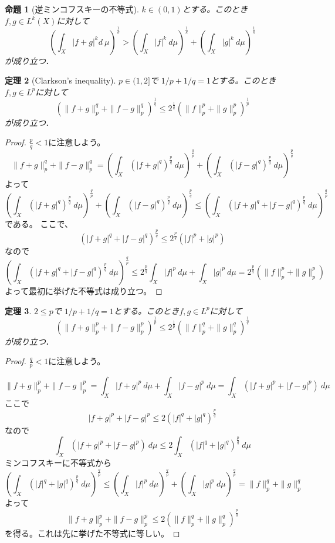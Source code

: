 \documentclass[leqno]{jsarticle}
\newtheorem{thm}{定理}
\newtheorem{prop}[thm]{命題}
\begin{document}
\begin{prop}[逆ミンコフスキーの不等式]
$k\in (0,1)$とする。このとき
$f, g\in L^{k}(X)$に対して
\[
\left(\int_X|f+g|^k d\ \mu\right)^{\frac{1}{k}}>\left(\int_X|f|^k \ d\mu\right)^{\frac{1}{k}}+\left(\int_X|g|^k \ d\mu\right)^{\frac{1}{k}}
\]
が成り立つ．
\end{prop}

\begin{thm}[Clarkson's inequality]
$p\in (1, 2]$で $1/p+1/q=1$とする。このとき$f,g\in L^p$に対して
\[
(\|f+g\|_p^q+\|f-g\|_p^q)^{\frac{1}{q}}\le 2^{\frac{1}{q}}(\|f\|_p^p+\|g\|_p^p)^{\frac{1}{p}}
\]
が成り立つ．
\end{thm}
\begin{proof}
$\frac{p}{q}<1$に注意しよう。
\[
\|f+g\|_p^q+\|f-g\|_p^q=\left(\int_X(|f+g|^q)^{\frac{p}{q}} \ d\mu\right)^{\frac{q}{p}}+\left(\int_X(|f-g|^q)^{\frac{p}{q}} \ d\mu\right)^{\frac{p}{q}}
\]
よって
\[
\left(\int_X(|f+g|^q)^{\frac{p}{q}} \ d\mu\right)^{\frac{q}{p}}+
\left(\int_X(|f-g|^q)^{\frac{p}{q}} \ d\mu\right)^{\frac{p}{q}}
\le 
\left(\int_X(|f+g|^q+|f-g|^q)^{\frac{p}{q}} \ d\mu\right)^{\frac{q}{p}}
\]
である。
ここで、
\[
(|f+g|^q+|f-g|^q)^{\frac{p}{q}} \le 2^{\frac{p}{q}}(|f|^p+|g|^p)
\]
なので
\[
\left(\int_X(|f+g|^q+|f-g|^q)^{\frac{p}{q}} \ d\mu\right)^{\frac{q}{p}}
\le 2^{\frac{p}{q}}\int_X|f|^p\ d\mu+\int_X|g|^p\ d\mu
=2^{\frac{p}{q}}(\|f\|_p^p+\|g\|_p^p)
\]
よって最初に挙げた不等式は成り立つ。
\end{proof}


\begin{thm}
$2\le p$で $1/p+1/q=1$とする。このとき$f,g\in L^p$に対して
\[
(\|f+g\|_p^p+\|f-g\|_p^p)^{\frac{1}{p}}\le 2^{\frac{1}{p}}(\|f\|_p^q+\|g\|_p^q)^{\frac{1}{q}}
\]
が成り立つ．
\end{thm}
\begin{proof}
$\frac{q}{p}<1$に注意しよう。

\[
\|f+g\|_p^p+\|f-g\|_p^p=\int_X|f+g|^p\ d\mu+\int_X|f-g|^p\ d\mu=
\int_X (|f+g|^p+|f-g|^p)\ d\mu
\]
ここで
\[
|f+g|^p+|f-g|^p\le 2(|f|^q+|g|^q)^{\frac{p}{q}}
\]
なので
\[
\int_X (|f+g|^p+|f-g|^p)\ d\mu
\le 2\int_X(|f|^q+|g|^q)^{\frac{p}{q}}\ d\mu
\]
ミンコフスキーに不等式から
\[
\left(\int_X(|f|^q+|g|^q)^{\frac{p}{q}}\ d\mu\right)^{\frac{q}{p}} \le
\left(\int_X|f|^p\ d\mu\right)^{\frac{q}{p}}+\left(\int_X|g|^p\ d\mu\right)^{\frac{q}{p}}=\|f\|_p^q+\|g\|_p^q
\]
よって
\[
\|f+g\|_p^p+\|f-g\|_p^p\le 2(\|f\|_p^q+\|g\|_p^q)^{\frac{p}{q}}
\]
を得る。これは先に挙げた不等式に等しい。
\end{proof}
\end{document}
